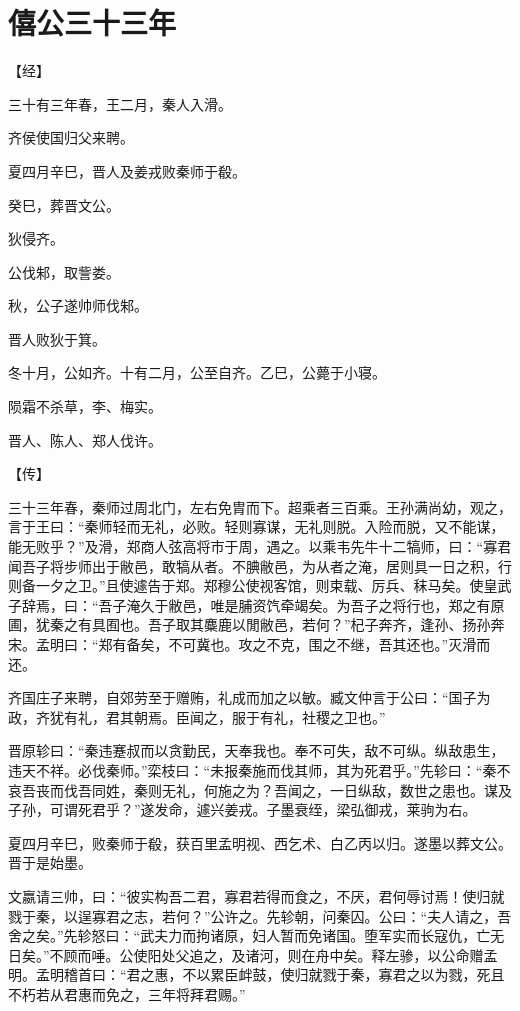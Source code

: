 \documentclass[a4paper,12pt,UTF8,twoside]{ctexbook}
\begin{document}
\section{僖公三十三年}


【经】

三十有三年春，王二月，秦人入滑。

齐侯使国归父来聘。

夏四月辛巳，晋人及姜戎败秦师于殽。

癸巳，葬晋文公。

狄侵齐。

公伐邾，取訾娄。

秋，公子遂帅师伐邾。

晋人败狄于箕。

冬十月，公如齐。十有二月，公至自齐。乙巳，公薨于小寝。

陨霜不杀草，李、梅实。

晋人、陈人、郑人伐许。

【传】

三十三年春，秦师过周北门，左右免胄而下。超乘者三百乘。王孙满尚幼，观之，言于王曰：“秦师轻而无礼，必败。轻则寡谋，无礼则脱。入险而脱，又不能谋，能无败乎？”及滑，郑商人弦高将市于周，遇之。以乘韦先牛十二犒师，曰：“寡君闻吾子将步师出于敝邑，敢犒从者。不腆敝邑，为从者之淹，居则具一日之积，行则备一夕之卫。”且使遽告于郑。郑穆公使视客馆，则束载、厉兵、秣马矣。使皇武子辞焉，曰：“吾子淹久于敝邑，唯是脯资饩牵竭矣。为吾子之将行也，郑之有原圃，犹秦之有具囿也。吾子取其麋鹿以閒敝邑，若何？”杞子奔齐，逢孙、扬孙奔宋。孟明曰：“郑有备矣，不可冀也。攻之不克，围之不继，吾其还也。”灭滑而还。

齐国庄子来聘，自郊劳至于赠贿，礼成而加之以敏。臧文仲言于公曰：“国子为政，齐犹有礼，君其朝焉。臣闻之，服于有礼，社稷之卫也。”

晋原轸曰：“秦违蹇叔而以贪勤民，天奉我也。奉不可失，敌不可纵。纵敌患生，违天不祥。必伐秦师。”栾枝曰：“未报秦施而伐其师，其为死君乎。”先轸曰：“秦不哀吾丧而伐吾同姓，秦则无礼，何施之为？吾闻之，一日纵敌，数世之患也。谋及子孙，可谓死君乎？”遂发命，遽兴姜戎。子墨衰绖，梁弘御戎，莱驹为右。

夏四月辛巳，败秦师于殽，获百里孟明视、西乞术、白乙丙以归。遂墨以葬文公。晋于是始墨。

文嬴请三帅，曰：“彼实构吾二君，寡君若得而食之，不厌，君何辱讨焉！使归就戮于秦，以逞寡君之志，若何？”公许之。先轸朝，问秦囚。公曰：“夫人请之，吾舍之矣。”先轸怒曰：“武夫力而拘诸原，妇人暂而免诸国。堕军实而长寇仇，亡无日矣。”不顾而唾。公使阳处父追之，及诸河，则在舟中矣。释左骖，以公命赠孟明。孟明稽首曰：“君之惠，不以累臣衅鼓，使归就戮于秦，寡君之以为戮，死且不朽若从君惠而免之，三年将拜君赐。”
\end{document}
